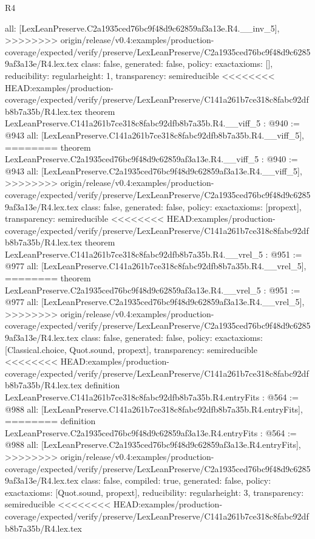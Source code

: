 \begin{lexlean}{R4}
\begin{coremodule}
{{{{{{{{{{{{  all: [LexLeanPreserve.C2a1935ced76bc9f48d9c62859af3a13e.R4.__inv_5],
>>>>>>>> origin/release/v0.4:examples/production-coverage/expected/verify/preserve/LexLeanPreserve/C2a1935ced76bc9f48d9c62859af3a13e/R4.lex.tex
  class: false,
  generated: false,
  policy: exact{axioms: []},
  reducibility: regular{height: 1},
  transparency: semireducible
}
<<<<<<<< HEAD:examples/production-coverage/expected/verify/preserve/LexLeanPreserve/C141a261b7ce318c8fabc92dfb8b7a35b/R4.lex.tex
theorem LexLeanPreserve.C141a261b7ce318c8fabc92dfb8b7a35b.R4.__viff_5 : @940 := @943 {
  all: [LexLeanPreserve.C141a261b7ce318c8fabc92dfb8b7a35b.R4.__viff_5],
========
theorem LexLeanPreserve.C2a1935ced76bc9f48d9c62859af3a13e.R4.__viff_5 : @940 := @943 {
  all: [LexLeanPreserve.C2a1935ced76bc9f48d9c62859af3a13e.R4.__viff_5],
>>>>>>>> origin/release/v0.4:examples/production-coverage/expected/verify/preserve/LexLeanPreserve/C2a1935ced76bc9f48d9c62859af3a13e/R4.lex.tex
  class: false,
  generated: false,
  policy: exact{axioms: [propext]},
  transparency: semireducible
}
<<<<<<<< HEAD:examples/production-coverage/expected/verify/preserve/LexLeanPreserve/C141a261b7ce318c8fabc92dfb8b7a35b/R4.lex.tex
theorem LexLeanPreserve.C141a261b7ce318c8fabc92dfb8b7a35b.R4.__vrel_5 : @951 := @977 {
  all: [LexLeanPreserve.C141a261b7ce318c8fabc92dfb8b7a35b.R4.__vrel_5],
========
theorem LexLeanPreserve.C2a1935ced76bc9f48d9c62859af3a13e.R4.__vrel_5 : @951 := @977 {
  all: [LexLeanPreserve.C2a1935ced76bc9f48d9c62859af3a13e.R4.__vrel_5],
>>>>>>>> origin/release/v0.4:examples/production-coverage/expected/verify/preserve/LexLeanPreserve/C2a1935ced76bc9f48d9c62859af3a13e/R4.lex.tex
  class: false,
  generated: false,
  policy: exact{axioms: [Classical.choice, Quot.sound, propext]},
  transparency: semireducible
}
<<<<<<<< HEAD:examples/production-coverage/expected/verify/preserve/LexLeanPreserve/C141a261b7ce318c8fabc92dfb8b7a35b/R4.lex.tex
definition LexLeanPreserve.C141a261b7ce318c8fabc92dfb8b7a35b.R4.entryFits : @564 := @988 {
  all: [LexLeanPreserve.C141a261b7ce318c8fabc92dfb8b7a35b.R4.entryFits],
========
definition LexLeanPreserve.C2a1935ced76bc9f48d9c62859af3a13e.R4.entryFits : @564 := @988 {
  all: [LexLeanPreserve.C2a1935ced76bc9f48d9c62859af3a13e.R4.entryFits],
>>>>>>>> origin/release/v0.4:examples/production-coverage/expected/verify/preserve/LexLeanPreserve/C2a1935ced76bc9f48d9c62859af3a13e/R4.lex.tex
  class: false,
  compiled: true,
  generated: false,
  policy: exact{axioms: [Quot.sound, propext]},
  reducibility: regular{height: 3},
  transparency: semireducible
}
<<<<<<<< HEAD:examples/production-coverage/expected/verify/preserve/LexLeanPreserve/C141a261b7ce318c8fabc92dfb8b7a35b/R4.lex.tex
}}}}}}}}}}}}}}
\end{coremodule}
\end{lexlean}
